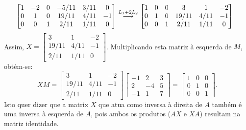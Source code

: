 \documentclass[12pt,a4paper]{article}
\newcommand{\grstep}[2][\relax]{%
   \ensuremath{\mathrel{
       {\mathop{\longrightarrow}\limits^{#2\mathstrut}_{
                                     \begin{subarray}{l} #1 \end{subarray}}}}}}
\begin{document}
\begin{enumerate}
\begin{align*}
&
\begin{bmatrix}
 1 & -2 & 0 & -5/11 & 3/11 &  0\\
 0 &  1 & 0 & 19/11 & 4/11 & -1\\
 0 &  0 & 1 &  2/11 & 1/11 &  0
\end{bmatrix}
\grstep{ L_1 + 2 L_2 }
\begin{bmatrix}
 1 & 0 & 0 & 3 & 1 & -2\\
 0 & 1 & 0 & 19/11 & 4/11 & -1\\
 0 & 0 & 1 &  2/11 & 1/11 &  0
\end{bmatrix}
\end{align*}
Assim,
$X = \begin{bmatrix}
    3 &    1 & -2\\
19/11 & 4/11 & -1\\
 2/11 & 1/11 &  0
\end{bmatrix}$. Multiplicando esta matriz à esquerda de $M$, obtém-se:
\[
XM =
\begin{bmatrix}
    3 &    1 & -2\\
19/11 & 4/11 & -1\\
 2/11 & 1/11 &  0
\end{bmatrix}
\begin{bmatrix}
-1 &  2 & 3 \\
 2 & -4 & 5 \\
-1 &  1 & 7
\end{bmatrix}
=\begin{bmatrix}
1 & 0 & 0 \\
0 & 1 & 0 \\
0 & 0 & 1
\end{bmatrix}.
\]
Isto quer dizer que a matrix $X$ que atua como inversa à direita de $A$ também é uma inversa à esquerda de $A$, pois ambos os produtos ($AX$ e $XA$) resultam na matriz identidade.



\end{enumerate}
\end{document}
